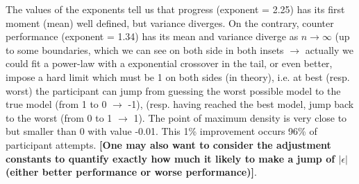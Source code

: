 The values of the exponents tell us that progress (exponent = 2.25) has its first moment (mean) well defined, but variance diverges. On the contrary, counter performance (exponent = 1.34) has its mean and variance diverge as $n \rightarrow \infty$ (up to some boundaries, which we can see on both side in both insets $\rightarrow$ actually we could fit a power-law with a exponential crossover in the tail, or even better, impose a hard limit which must be 1 on both sides (in theory), i.e. at best (resp. worst) the participant can jump from guessing the worst possible model to the true model (from 1 to 0 $\rightarrow$ -1), (resp. having reached the best model, jump back to the worst (from 0 to 1 $\rightarrow$ 1). The point of maximum density is very close to but smaller than 0 with value -0.01. This 1\% improvement occurs 96\% of participant attempts. {\bf [One may also want to consider the adjustment constants to quantify exactly how much it likely to make a jump of $|\epsilon|$ (either better performance or worse performance)]}.